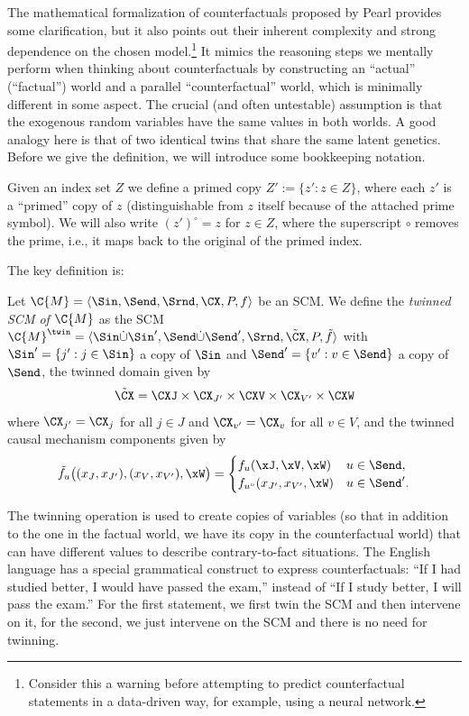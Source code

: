 The mathematical formalization of counterfactuals proposed by Pearl provides some clarification, but it also points out their 
inherent complexity and strong dependence on the chosen model.\footnote{Consider this a warning before attempting to 
predict counterfactual statements in a data-driven way, for example, using a neural network.}
It mimics the reasoning steps we mentally perform when thinking about counterfactuals by constructing an ``actual''
(``factual'') world and a parallel ``counterfactual'' world, which is minimally different in some aspect.
The crucial (and often untestable) assumption is that the exogenous random variables have the same values in both worlds.
A good analogy here is that of two identical twins that share the same latent genetics. 
Before we give the definition, we will introduce some bookkeeping notation.
\begin{Not}
  Given an index set $Z$ we define a primed copy $Z' := \{z' : z \in Z\}$, where each $z'$ is a ``primed'' copy of $z$ 
  (distinguishable from $z$ itself because of the attached prime symbol). 
  We will also write $(z')^\circ = z$ for $z \in Z$, where the superscript $\circ$ removes the prime, i.e., it
  maps back to the original of the primed index.
\end{Not}
The key definition is:
\begin{Def}
  Let $\C{M} = \langle \Sin, \Send, \Srnd, \CX, P, f \rangle$ be an SCM. We define the \emph{twinned SCM of $\C{M}$} as
  the SCM $\C{M}^\twin = \langle \Sin \dot\cup \Sin', \Send \dot\cup \Send', \Srnd, \tilde{\CX}, P, \tilde{f} \rangle$
  with $\Sin' = \{j' : j \in \Sin\}$ a copy of $\Sin$ and
  $\Send' = \{v' : v \in \Send\}$ a copy of $\Send$, the twinned domain given by
  $$\tilde{\CX} = \CXJ \times \CX_{J'} \times \CXV \times \CX_{V'} \times \CXW$$
  where $\CX_{j'} = \CX_j$ for all $j \in J$ and $\CX_{v'} = \CX_v$ for all $v \in V$,
  and the twinned causal mechanism components given by
  $$\tilde{f}_u\big((x_J,x_{J'}),(x_V,x_{V'}),\xW\big) = 
  \begin{cases}
    f_u(\xJ,\xV,\xW) & u \in \Send,  \\
    f_{u^\circ}(x_{J'},x_{V'},\xW) & u \in \Send'.
  \end{cases}$$
\end{Def}
The twinning operation is used to create copies of variables (so that in addition to the one in the factual world, 
we have its copy in the counterfactual world) that can have different values to describe contrary-to-fact situations.
The English language has a special grammatical construct to express counterfactuals:
``If I had studied better, I would have passed the exam,'' instead of ``If I study better, I will pass the exam.''
For the first statement, we first twin the SCM and then intervene on it, for the second, we just intervene on the SCM and there is no need for twinning. 

